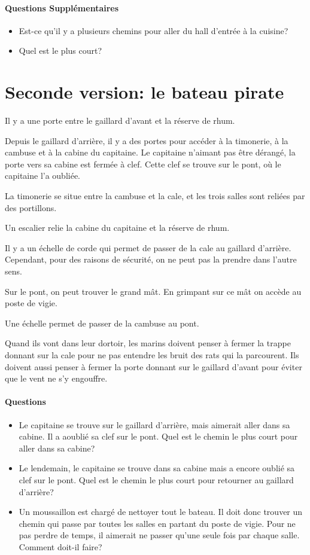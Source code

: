 \documentclass[dvipsnames]{article}
\begin{document}
\paragraph{Questions Supplémentaires}
\begin{itemize}
\item Est-ce qu'il y a plusieurs chemins pour aller du hall d'entrée à la cuisine?
\item Quel est le plus court?
\end{itemize}

\newpage
\section{Seconde version: le bateau pirate}

Il y a une porte entre le gaillard d'avant et la réserve de rhum.

Depuis le gaillard d'arrière, il y a des portes pour accéder à la timonerie, à la cambuse et à la cabine du capitaine.
Le capitaine n'aimant pas être dérangé, la porte vers sa cabine est fermée à clef. Cette clef se trouve sur le pont, où le capitaine l'a oubliée.

La timonerie se situe entre la cambuse et la cale, et les trois salles sont reliées par des portillons.

Un escalier relie la cabine du capitaine et la réserve de rhum.

Il y a un échelle de corde qui permet de passer de la cale au gaillard d'arrière. Cependant, pour des raisons de sécurité, on ne peut pas la prendre dans l'autre sens.

Sur le pont, on peut trouver le grand mât. En grimpant sur ce mât on accède au poste de vigie.

Une échelle permet de passer de la cambuse au pont.

Quand ils vont dans leur dortoir, les marins doivent penser à fermer la trappe donnant sur la cale pour ne pas entendre les bruit des rats qui la parcourent. Ils doivent aussi penser à fermer la porte donnant sur le gaillard d'avant pour éviter que le vent ne s'y engouffre.


\paragraph{Questions}
\begin{itemize}
\item Le capitaine se trouve sur le gaillard d'arrière, mais aimerait aller dans sa cabine. Il a aoublié sa clef sur le pont. Quel est le chemin le plus court pour aller dans sa cabine?
\item Le lendemain, le capitaine se trouve dans sa cabine mais a encore oublié sa clef sur le pont. Quel est le chemin le plus court pour retourner au gaillard d'arrière?
\item Un moussaillon est chargé de nettoyer tout le bateau. Il doit donc trouver un chemin qui passe par toutes les salles en partant du poste de vigie. Pour ne pas perdre de temps, il aimerait ne passer qu'une seule fois par chaque salle. Comment doit-il faire?
\end{itemize}
\end{document}
